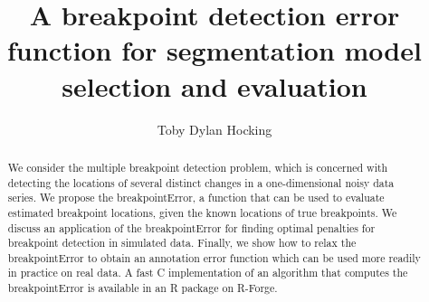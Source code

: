 \documentclass{article}
\begin{document}

  


  \title{A breakpoint detection error function for segmentation model
    selection and evaluation}
  \author{Toby Dylan Hocking}

\maketitle

  \begin{abstract}
    We consider the multiple breakpoint detection problem, which is
    concerned with detecting the locations of several distinct changes
    in a one-dimensional noisy data series. We propose the
    breakpointError, a function that can be used to evaluate estimated
    breakpoint locations, given the known locations of true
    breakpoints. We discuss an application of the breakpointError for
    finding optimal penalties for breakpoint detection in simulated
    data. Finally, we show how to relax the breakpointError to obtain
    an annotation error function which can be used more readily in
    practice on real data. A fast C implementation of an algorithm
    that computes the breakpointError is available in an R package on
    R-Forge.
  \end{abstract}

\tableofcontents


\end{document}

